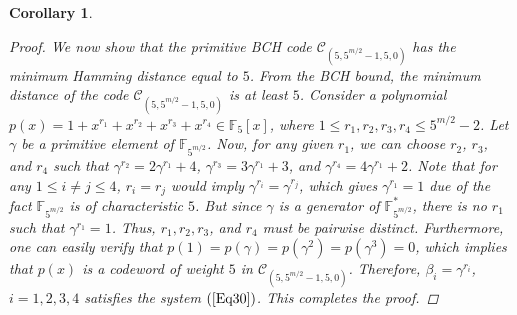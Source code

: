 \documentclass[pdflatex,sn-mathphys-num]{sn-jnl}%
\theoremstyle{thmstyleone}%
\newtheorem{corollary}{Corollary}%
\theoremstyle{thmstyletwo}%
\theoremstyle{thmstylethree}%
\begin{document}
\begin{corollary}
\begin{proof}
       \par We now show that the primitive BCH code $\mathcal{C}_{(5,5^{m/2}-1,5,0)}$ has the minimum Hamming distance equal to $5$. From the BCH bound, the minimum distance of the code $\mathcal{C}_{(5,5^{m/2}-1,5,0)}$ is at least $5$. Consider a polynomial $p(x)=1+x^{r_{1}}+x^{r_{2}}+x^{r_{3}}+x^{r_{4}}\in\mathbb{F}_{5}[x]$, where $1\leq r_{1},r_{2},r_{3},r_{4}\leq 5^{m/2}-2$. Let $\gamma$ be a primitive element of $\mathbb{F}_{5^{m/2}}$. Now, for any given $r_{1}$, we can choose $r_{2}$, $r_{3}$, and $r_{4}$ such that $\gamma^{r_{2}}=2\gamma^{r_{1}}+4$, $\gamma^{r_{3}}=3\gamma^{r_{1}}+3$, and $\gamma^{r_{4}}=4\gamma^{r_{1}}+2$. Note that for any $1\leq i\neq j\leq 4$, $r_{i}=r_{j}$ would imply $\gamma^{r_{i}}=\gamma^{r_{j}}$, which gives $\gamma^{r_{1}}=1$ due of the fact $\mathbb{F}_{5^{m/2}}$ is of characteristic $5$. But since $\gamma$ is a generator of $\mathbb{F}_{5^{m/2}}^{*}$, there is no $r_{1}$ such that $\gamma^{r_{1}}=1$. Thus, $r_{1},r_{2},r_{3}$, and $r_{4}$ must be pairwise distinct. Furthermore, one can easily verify that $p(1)=p(\gamma)=p(\gamma^2)=p(\gamma^3)=0$, which implies that $p(x)$ is a codeword of weight $5$ in $\mathcal{C}_{(5,5^{m/2}-1,5,0)}$. Therefore, $\beta_{i}=\gamma^{r_{i}}$, $i=1,2,3,4$ satisfies the system $(\ref{Eq30})$. This completes the proof.
    \end{proof}
\end{corollary}
\end{document}
